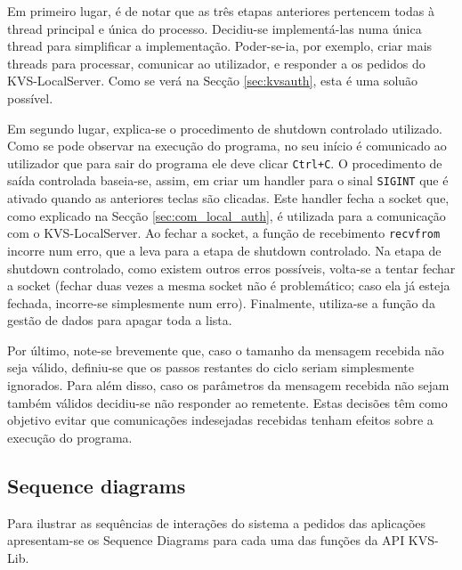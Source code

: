 Em primeiro lugar, é de notar que as três etapas anteriores pertencem todas à thread principal e única do processo. Decidiu-se implementá-las numa única thread para simplificar a implementação. Poder-se-ia, por exemplo, criar mais threads para processar, comunicar ao utilizador, e responder a os pedidos do KVS-LocalServer. Como se verá na Secção \ref{sec:kvsauth}, esta é uma soluão possível.

Em segundo lugar, explica-se o procedimento de shutdown controlado utilizado. Como se pode observar na execução do programa, no seu início é comunicado ao utilizador que para sair do programa ele deve clicar \texttt{Ctrl+C}. O procedimento de saída controlada baseia-se, assim, em criar um handler para o sinal \texttt{SIGINT} que é ativado quando as anteriores teclas são clicadas. Este handler fecha a socket que, como explicado na Secção \ref{sec:com_local_auth}, é utilizada para a comunicação com o KVS-LocalServer. Ao fechar a socket, a função de recebimento \texttt{recvfrom} incorre num erro, que a leva para a etapa de shutdown controlado. Na etapa de shutdown controlado, como existem outros erros possíveis, volta-se a tentar fechar a socket (fechar duas vezes a mesma socket não é problemático; caso ela já esteja fechada, incorre-se simplesmente num erro). Finalmente, utiliza-se a função da gestão de dados para apagar toda a lista.

Por último, note-se brevemente que, caso o tamanho da mensagem recebida não seja válido, definiu-se que os passos restantes do ciclo seriam simplesmente ignorados. Para além disso, caso os parâmetros da mensagem recebida não sejam também válidos decidiu-se não responder ao remetente. Estas decisões têm como objetivo evitar que comunicações indesejadas recebidas tenham efeitos sobre a execução do programa.

\subsection{Sequence diagrams} \label{sec:seq_diag}

Para ilustrar as sequências de interações do sistema a pedidos das aplicações apresentam-se os Sequence Diagrams para cada uma das funções da API KVS-Lib.

